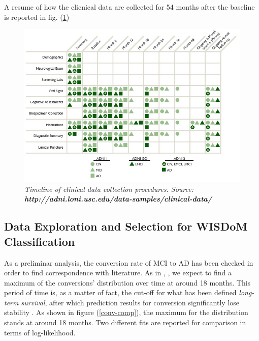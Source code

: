 \documentclass[12pt,openright,twoside,a4paper]{book}
\begin{document}
A resume of how the clicnical data are collected for 54 months after the baseline is reported in fig. (\ref{clinicADNI})

\clearpage

\begin{figure}[!h]
\centering
\includegraphics[scale=0.5]{clinical-ADNI}
\caption{\textit{Timeline of clinical data collection procedures. Source: \textbf{http://adni.loni.usc.edu/data-samples/clinical-data/}}}
\label{clinicADNI}
\end{figure}

\subsection{Data Exploration and Selection for WISDoM Classification}

As a preliminar analysis, the conversion rate of MCI to AD has been checked in order to find correspondence with literature. As in \cite{conv}, \cite{conv2} , we expect to find a maximum of the conversions' distribution over time at around 18 months. 
This period of time is, as a matter of fact, the cut-off for what has been defined \textit{long-term survival}, after which prediction results for conversion significantly lose stability \cite{conv2}.
As shown in figure (\ref{conv-comp}), the maximum for the distribution stands at around 18 months.
Two different fits are reported for comparison in terms of log-likelihood.
\end{document}
